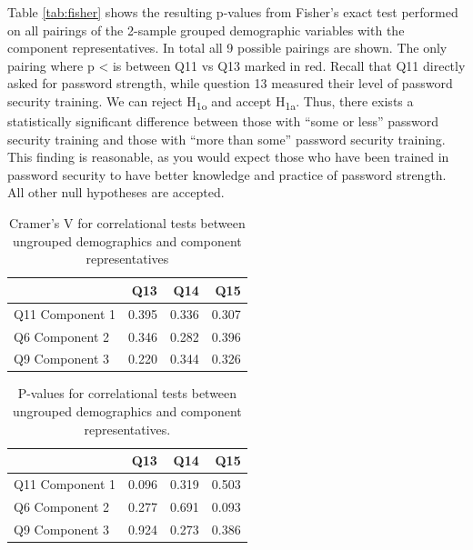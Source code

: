 \documentclass[letterpaper, 10 pt, conference]{ieeeconf}  %
\begin{document}
Table \ref{tab:fisher} shows the resulting p-values from Fisher’s exact test performed on all pairings of the 2-sample grouped demographic variables with the component representatives. In total all 9 possible pairings are shown. The only pairing where p < \textalpha{} is between Q11 vs Q13 marked in red. Recall that Q11 directly asked for password strength, while question 13 measured their level of password security training. We can reject H\textsubscript{1o} and accept H\textsubscript{1a}. Thus, there exists a statistically significant difference between those with “some or less” password security training and those with “more than some” password security training. This finding is reasonable, as you would expect those who have been trained in password security to have better knowledge and practice of password strength. All other null hypotheses are accepted.

\begin{table}[h]
\caption{Cramer’s V for correlational tests between ungrouped demographics and component representatives}
\label{tab:cramer}
\begin{center}
\begin{tabular}{lrrr}
\hline
                & Q13   & Q14   & Q15   \\ \hline
Q11 Component 1 & 0.395 & 0.336 & 0.307 \\ \hline
Q6 Component 2  & 0.346 & 0.282 & 0.396 \\ \hline
Q9 Component 3  & 0.220 & 0.344 & 0.326 \\ \hline
\end{tabular}
\end{center}
\end{table}

\begin{table}[h]
\caption{P-values for correlational tests between ungrouped demographics and component representatives.}
\label{tab:cramerp}
\begin{center}
\begin{tabular}{lrrr}
\hline
                & Q13   & Q14   & Q15   \\ \hline
Q11 Component 1 & 0.096 & 0.319 & 0.503 \\ \hline
Q6 Component 2  & 0.277 & 0.691 & 0.093 \\ \hline
Q9 Component 3  & 0.924 & 0.273 & 0.386 \\ \hline
\end{tabular}
\end{center}
\end{table}
\end{document}
